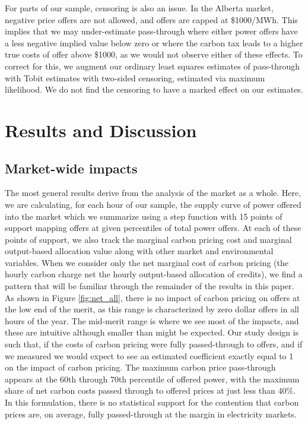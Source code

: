 \documentclass[12pt]{article}
\begin{document}
For parts of our sample, censoring is also an issue. In the Alberta market, negative price offers are not allowed, and offers are capped at \$1000/MWh. This implies that we may under-estimate pass-through where either power offers have a less negative implied value below zero or where the carbon tax leads to a higher true costs of offer above \$1000, as we would not observe either of these effects. To correct for this, we augment our ordinary least squares estimates of pass-through with Tobit estimates with two-sided censoring, estimated via maximum likelihood. We do not find the censoring to have a marked effect on our estimates.


\section{Results and Discussion}

\subsection{Market-wide impacts}
The most general results derive from the analysis of the market as a whole. Here, we are calculating, for each hour of our sample, the supply curve of power offered into the market which we summarize using a step function with 15 points of support mapping offers at given percentiles of total power offers. At each of these points of support, we also track the marginal carbon pricing cost and marginal output-based allocation value along with other market and environmental variables. When we consider only the net marginal cost of carbon pricing (the hourly carbon charge net the hourly output-based allocation of credits), we find a pattern that will be familiar through the remainder of the results in this paper. As shown in Figure \ref{fig:net_all}, there is no impact of carbon pricing on offers at the low end of the merit, as this range is characterized by zero dollar offers in all hours of the year. The mid-merit range is where we see most of the impacts, and these are intuitive although smaller than might be expected. Our study design is such that, if the costs of carbon pricing were fully passed-through to offers, and if we measured we would expect to see an estimated coefficient exactly equal to 1 on the impact of carbon pricing. The maximum carbon price pass-through appears at the 60th through 70th percentile of offered power, with the maximum share of net carbon costs passed through to offered prices at just less than 40\%. In this formulation, there is no statistical support for the contention that carbon prices are, on average, fully passed-through at the margin in electricity markets.
\end{document}
